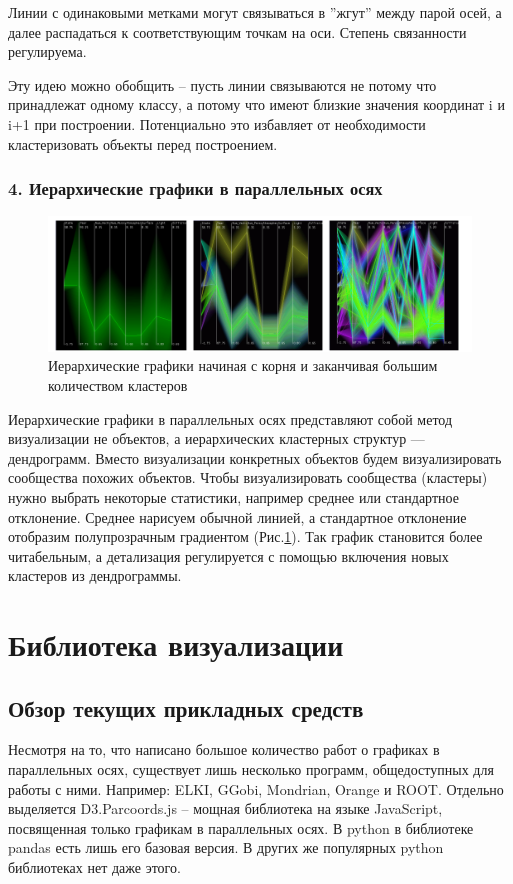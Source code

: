 \documentclass[12pt,fleqn]{article}
\begin{document}
Линии с одинаковыми метками могут связываться в ''жгут'' между парой осей, а 
далее распадаться к соответствующим точкам на оси. Степень связанности регулируема.\cite{bundling}

Эту идею можно обобщить -- пусть линии связываются не потому что принадлежат одному классу, 
а потому что имеют близкие значения координат i и i+1 при построении. Потенциально это избавляет
от необходимости кластеризовать объекты перед построением.

\subsubsection{4. Иерархические графики в параллельных осях}
\begin{figure}[htb]
    \centering
    \includegraphics[width=14cm]{hierarchical.png}
    \caption{Иерархические графики начиная с корня и заканчивая большим количеством кластеров}
    \label{hierarchical_coords}
\end{figure}
Иерархические графики в параллельных осях представляют собой метод визуализации не объектов, а иерархических
кластерных структур --- дендрограмм. Вместо визуализации конкретных объектов будем
визуализировать сообщества похожих объектов. Чтобы визуализировать сообщества (кластеры)
нужно выбрать некоторые статистики, например среднее или стандартное отклонение. Среднее нарисуем обычной линией, а 
стандартное отклонение отобразим полупрозрачным градиентом (Рис.\ref{hierarchical_coords}).
Так график становится более читабельным, а детализация регулируется с
помощью включения новых кластеров из дендрограммы.\cite{hierarchical}

\section{Библиотека визуализации}
\subsection{Обзор текущих прикладных средств}
Несмотря на то, что написано большое количество работ о графиках в параллельных осях, 
существует лишь несколько программ, общедоступных для работы с ними.
Например: ELKI, GGobi, Mondrian, Orange и ROOT. Отдельно выделяется D3.Parcoords.js -- 
мощная библиотека на языке JavaScript, посвященная только графикам в параллельных осях.
В python в библиотеке pandas есть лишь его базовая версия. В других же популярных
python библиотеках нет даже этого.
\end{document}
